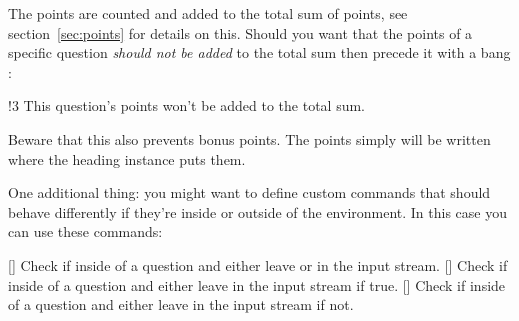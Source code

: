 \documentclass[load-preamble+]{cnltx-doc}
\begin{document}
The points are counted and added to the total sum of points, see
section~\ref{sec:points} for details on this.  Should you
want that the points of a specific question \emph{should not be added} to the
total sum then precede it with a bang \code{!}:
\begin{example}
  \begin{question}{!3}
    This question's points won't be added to the total sum.
  \end{question}
\end{example}
Beware that this also prevents bonus points.  The points simply will be
written where the heading instance puts them.

One additional thing: you might want to define custom
commands that should behave differently if they're inside or outside of the
 environment.  In this case you can use these commands:
\begin{commands}
  \expandable{}[]
    Check if inside of a question and either leave  or
     in the input stream.
  \expandable{}[]
    Check if inside of a question and either leave  in the
    input stream if true.
  \expandable{}[]
    Check if inside of a question and either leave  in the
    input stream if not.
\end{commands}
\end{document}

